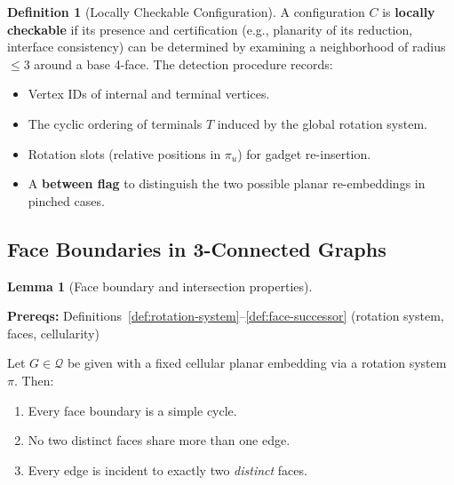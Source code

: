 \documentclass[12pt]{article}
\theoremstyle{definition}
\newtheorem{lemma}[theorem]{Lemma}
\newtheorem{definition}[theorem]{Definition}
\newcommand{\prereq}[1]{\par\noindent\textbf{Prereqs:} #1\par}
\begin{document}
\begin{definition}[Locally Checkable Configuration] \label{def:config-detection}
A configuration $C$ is \textbf{locally checkable} if its presence and certification (e.g., planarity of its reduction, interface consistency) can be determined by examining a neighborhood of radius $\le 3$ around a base 4-face. The detection procedure records:
\begin{itemize}
    \item Vertex IDs of internal and terminal vertices.
    \item The cyclic ordering of terminals $T$ induced by the global rotation system.
    \item Rotation slots (relative positions in $\pi_u$) for gadget re-insertion.
    \item A \textbf{between flag} to distinguish the two possible planar re-embeddings in pinched cases.
\end{itemize}
\end{definition}

\subsection{Face Boundaries in 3-Connected Graphs}
\label{subsec:face-boundaries}

\begin{lemma}[Face boundary and intersection properties]\label{lem:face-boundary}
\prereq{Definitions~\ref{def:rotation-system}--\ref{def:face-successor} (rotation system, faces, cellularity)}
Let $G\in\mathcal{Q}$ be given with a fixed cellular planar embedding via a rotation system $\pi$.
Then:
\begin{enumerate}
    \item Every face boundary is a simple cycle.
    \item No two distinct faces share more than one edge.
    \item Every edge is incident to exactly two \emph{distinct} faces.
\end{enumerate}
\end{lemma}
\end{document}

